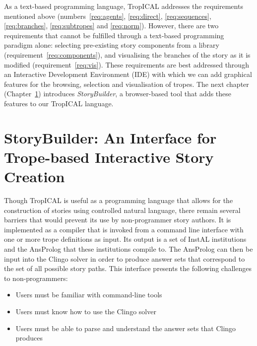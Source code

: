 \documentclass[11pt]{report}
\begin{document}
As a text-based programming language, TropICAL addresses the requirements
mentioned above (numbers~\ref{req:agents}, \ref{req:direct},
\ref{req:sequences}, \ref{req:branches}, \ref{req:subtropes} and
\ref{req:norm}). However, there are two requirements that cannot be fulfilled
through a text-based programming paradigm alone: selecting pre-existing story
components from a library (requirement~\ref{req:components}), and visualising
the branches of the story as it is modified (requirement~\ref{req:vis}). These
requirements are best addressed through an Interactive Development Environment
(IDE) with which we can add graphical features for the browsing, selection and
visualisation of tropes. The next chapter (Chapter~\ref{cha:storybuilder})
introduces \emph{StoryBuilder}, a browser-based tool that adds these features to
our TropICAL language.




\chapter{StoryBuilder: An Interface for Trope-based Interactive Story Creation}
\label{cha:storybuilder}

Though TropICAL is useful as a programming language that allows for the
construction of stories using controlled natural language, there remain several
barriers that would prevent its use by non-programmer story authors. It is
implemented as a compiler that is invoked from a command line interface with one
or more trope definitions as input. Its output is a set of InstAL institutions
and the AnsProlog that these institutions compile to. The AnsProlog can then be
input into the Clingo solver in order to produce answer sets
that correspond to the set of all possible story paths. This interface presents
the following challenges to non-programmers:

\begin{itemize}
  \item Users must be familiar with command-line tools
  \item Users must know how to use the Clingo solver
  \item Users must be able to parse and understand the answer sets that Clingo produces
\end{itemize}
\end{document}
